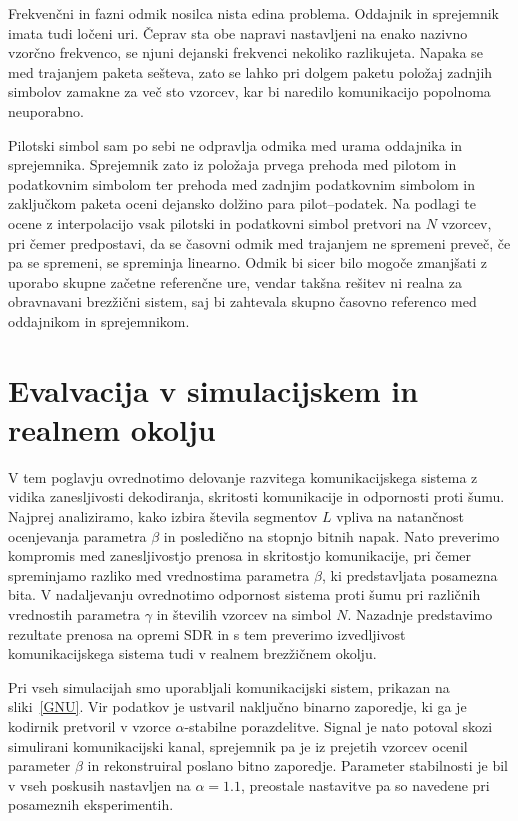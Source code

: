 \documentclass[a4paper, 12pt, openany]{book}
\begin{document}
Frekvenčni in fazni odmik nosilca nista edina problema. Oddajnik in sprejemnik imata tudi ločeni uri. Čeprav sta obe napravi nastavljeni na enako nazivno vzorčno frekvenco, se njuni dejanski frekvenci nekoliko razlikujeta. Napaka se med trajanjem paketa sešteva, zato se lahko pri dolgem paketu položaj zadnjih simbolov zamakne za več sto vzorcev, kar bi naredilo komunikacijo popolnoma neuporabno.

Pilotski simbol sam po sebi ne odpravlja odmika med urama oddajnika in sprejemnika. Sprejemnik zato iz položaja prvega prehoda med pilotom in podatkovnim simbolom ter prehoda med zadnjim podatkovnim simbolom in zaključkom paketa oceni dejansko dolžino para pilot--podatek. Na podlagi te ocene z interpolacijo vsak pilotski in podatkovni simbol pretvori na $N$ vzorcev, pri čemer predpostavi, da se časovni odmik med trajanjem ne spremeni preveč, če pa se spremeni, se spreminja linearno. Odmik bi sicer bilo mogoče zmanjšati z uporabo skupne začetne referenčne ure, vendar takšna rešitev ni realna za obravnavani brezžični sistem, saj bi zahtevala skupno časovno referenco med oddajnikom in sprejemnikom.

\chapter{Evalvacija v simulacijskem in realnem okolju}

V tem poglavju ovrednotimo delovanje razvitega komunikacijskega sistema z vidika zanesljivosti dekodiranja, skritosti komunikacije in odpornosti proti šumu. Najprej analiziramo, kako izbira števila segmentov $L$ vpliva na natančnost ocenjevanja parametra $\beta$ in posledično na stopnjo bitnih napak. Nato preverimo kompromis med zanesljivostjo prenosa in skritostjo komunikacije, pri čemer spreminjamo razliko med vrednostima parametra $\beta$, ki predstavljata posamezna bita. V nadaljevanju ovrednotimo odpornost sistema proti šumu pri različnih vrednostih parametra $\gamma$ in številih vzorcev na simbol $N$. Nazadnje predstavimo rezultate prenosa na opremi SDR in s tem preverimo izvedljivost komunikacijskega sistema tudi v realnem brezžičnem okolju.

Pri vseh simulacijah smo uporabljali komunikacijski sistem, prikazan na sliki~\ref{GNU}. Vir podatkov je ustvaril naključno binarno zaporedje, ki ga je kodirnik pretvoril v vzorce $\alpha$-stabilne porazdelitve. Signal je nato potoval skozi simulirani komunikacijski kanal, sprejemnik pa je iz prejetih vzorcev ocenil parameter $\beta$ in rekonstruiral poslano bitno zaporedje. Parameter stabilnosti je bil v vseh poskusih nastavljen na $\alpha=1.1$, preostale nastavitve pa so navedene pri posameznih eksperimentih.
\end{document}
